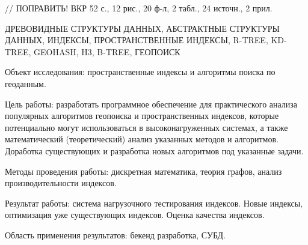 \Referat %

// ПОПРАВИТЬ!
ВКР 52 с., 12 рис., 20 ф-л, 2 табл., 24 источн., 2 прил. %

\noindent ДРЕВОВИДНЫЕ СТРУКТУРЫ ДАННЫХ, АБСТРАКТНЫЕ СТРУКТУРЫ ДАННЫХ, ИНДЕКСЫ, ПРОСТРАНСТВЕННЫЕ ИНДЕКСЫ, R-TREE, KD-TREE, GEOHASH, H3, B-TREE, ГЕОПОИСК


Объект исследования: пространственные индексы и алгоритмы поиска по геоданным. 

Цель работы: разработать программное обеспечение для практического анализа популярных алгоритмов геопоиска и пространственных индексов, которые потенциально могут использоваться в высоконагруженных системах, а также математический (теоретический) анализ указанных методов и алгоритмов. Доработка существующих и разработка новых алгоритмов под указанные задачи.

Методы проведения работы: дискретная математика, теория графов, анализ производительности индексов. 

Результат работы: система нагрузочного тестирования индексов. Новые индексы, оптимизация уже существующих индексов. Оценка качества индексов. 

Область применения результатов: бекенд разработка, СУБД.



